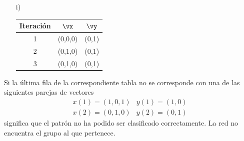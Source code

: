 \begin{problem}[10]
\begin{multicols}{2}
\begin{enumerate}
\item[i)]

\begin{tabular}{|ccc|}
\hline
\textbf{Iteración} & $\vx$ & $\vy$ \\
\hline
1 & (0,0,0) & (0,1) \\
\hline
2 & (0,1,0) & (0,1) \\
\hline
3 & (0,1,0) & (0,1) \\
\hline
\end{tabular}
\end{enumerate}
\end{multicols}
Si la última fila de la correspondiente tabla no se corresponde con una de las siguientes parejas de vectores
\[\begin{array}{ll}
x(1)=(1,0,1) & y(1)=(1,0)\\
x(2) = (0,1,0) & y(2) = (0,1)
\end{array}\]
significa que el patrón no ha podido ser clasificado correctamente. La red no encuentra el grupo al que pertenece.
\end{problem}

